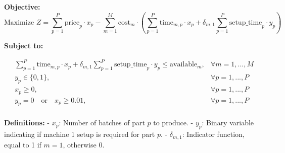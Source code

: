 \documentclass{article}
\begin{document}
\textbf{Objective:}
\[
\text{Maximize } Z = \sum_{p=1}^{P} \text{price}_{p} \cdot x_p - \sum_{m=1}^{M} \text{cost}_{m} \cdot \left( \sum_{p=1}^{P} \text{time}_{m,p} \cdot x_p + \delta_{m,1} \sum_{p=1}^{P} \text{setup\_time}_{p} \cdot y_p \right)
\]

\textbf{Subject to:}

\begin{align*}
& \sum_{p=1}^{P} \text{time}_{m,p} \cdot x_p + \delta_{m,1} \sum_{p=1}^{P} \text{setup\_time}_{p} \cdot y_p \leq \text{available}_{m}, & \forall m = 1, ..., M \\
& y_p \in \{0, 1\}, & \forall p = 1, ..., P \\
& x_p \geq 0, & \forall p = 1, ..., P \\
& y_p = 0 \quad \text{or} \quad x_p \geq 0.01, & \forall p = 1, ..., P \\
\end{align*}

\textbf{Definitions:}
- \( x_p \): Number of batches of part \( p \) to produce.
- \( y_p \): Binary variable indicating if machine 1 setup is required for part \( p \).
- \( \delta_{m,1} \): Indicator function, equal to 1 if \( m = 1 \), otherwise 0.
\end{document}
